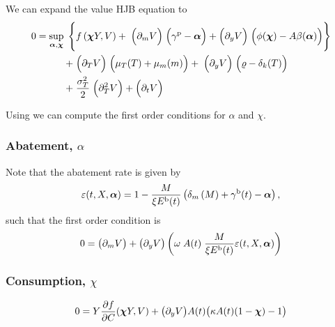 \documentclass[../../main.tex]{subfiles}
\begin{document}
We can expand the value HJB equation to     
\begin{equation}
    \begin{split}
        0 = \sup_{\bm{\alpha}, \bm{\chi}} \; \Bigg\{ &f\left(\bm{\chi} Y, V\right) + \;
        \Big(\partial_{m} V \Big) \; \Big(\gamma^{\mathrm{p}} - \bm{\alpha} \Big) + \Big(\partial_{y} V \Big) \;  \Big(\phi(\bm{\chi}) - A \beta(\bm{\alpha}) \Big) \Bigg\} \\
        + \; &\Big(\partial_T V \Big) \; \Big(\mu_T(T) + \mu_{m}(m) \Big) + \;
        \Big(\partial_{y} V \Big) \; \Big(\varrho - \delta_k(T) \Big) \\
        + \; &\frac{\sigma_T^2}{2} \; \Big(\partial^2_T V \Big) + \Big(\partial_t V\Big)
    \end{split}
\end{equation}

Using we can compute the first order conditions for $\alpha$ and $\chi$. 

\subsubsection[Abatement]{Abatement, $\alpha$}

Note that the abatement rate is given by \begin{equation}
    \varepsilon(t, X, \bm{\alpha}) = 1 - \frac{M}{\xi E^{\mathrm{b}}(t)} \left(\delta_m\left( M\right) + \gamma^{\mathrm{b}}(t) - \bm{\alpha} \right),
\end{equation} such that the first order condition is \begin{equation}
    0 = \big(\partial_m V\big) + \big(\partial_y V\big) \left(\omega \; A(t) \; \frac{M}{\xi E^{\mathrm{b}}(t)} \varepsilon(t, X, \bm{\alpha}) \right)
\end{equation}

\subsubsection[Consumption]{Consumption, $\chi$}

\begin{equation}
    0 = Y \frac{\partial f}{\partial C}(\bm{\chi} Y, V) +\big(\partial_y V\big) A(t) \big(\kappa A(t) (1 - \bm{\chi}) - 1\big) 
\end{equation}
\end{document}
